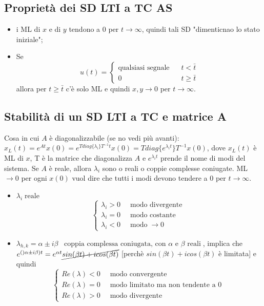 \subsection*{Proprietà dei SD LTI a TC AS}
\begin{itemize}
    \item i ML di $x$ e di $y$ tendono a $0$ per $t \rightarrow  \infty$, quindi tali SD "dimenticnao lo stato iniziale";
    \item Se 
    \[
        u(t) = \begin{cases}
            \text{qualsiasi segnale}\; \;\; & t< \bar{t}\\
            0 & t \geq \bar{t}
        \end{cases}
    \]
    allora per $t \geq \bar{t}$ c'è solo ML e quindi $x,y \rightarrow 0$ per $t \rightarrow \infty$.
\end{itemize}
\subsection*{Stabilità di un SD LTI a TC e matrice A}
Cosa in cui $A$ è diagonalizzabile (se no vedi più avanti):
$x_L (t) = e^{At} x(0) = e^{T diag\{\lambda_i\}T^{-1} t}x(0) = T diag\{e^{\lambda_i t}\}T^{-1}x(0)$, dove $x_L(t)$ è ML di $x$, T è la matrice che diagonalizza $A$ e $e^{\lambda_it}$ prende il nome di modi del sistema.\newline
\newline
Se $A$ è reale, allora $\lambda_i$ sono o reali o coppie complesse coniugate.\newline
ML $\rightarrow  0$ per ogni $x(0)$ vuol dire che tutti i modi devono tendere a $0$ per $t \rightarrow \infty$.
\begin{itemize}
    \item $\lambda_i \; \text{reale}$
    \[
        \begin{cases}
            \lambda_i >0 \;\;& \text{modo divergente}\;\\
            \lambda_i =0 \;\;& \text{modo costante}\;\\
            \lambda_i <0 \;\;& \text{modo}\;\rightarrow  0
        \end{cases}
    \]
    \item $\lambda_{h,k} = \alpha \pm i \beta \;\;\;\text{coppia complessa coniugata, con $\alpha$ e $\beta$ reali}\;$, implica che $e^{()\alpha \pm i \beta)t} = e^{\alpha t} \cancel{sin(\beta t) + i cos(\beta t)}$ [perchè $sin(\beta t) + i cos(\beta t)$ è limitata] e quindi
    \[
        \begin{cases}
            Re(\lambda) < 0 \;\; & \text{modo convergente}\;\\
            Re(\lambda) = 0 \;\; & \text{modo limitato ma non tendente a $0$}\;\\
            Re(\lambda) > 0 \;\; & \text{modo divergente}\;
        \end{cases}
    \]
\end{itemize}
